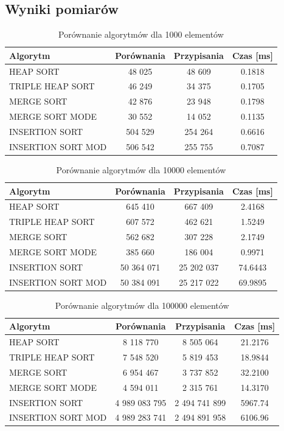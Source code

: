 \documentclass[12pt,a4paper]{article}
\begin{document}
\subsection{Wyniki pomiarów}

\begin{table}[H]
\centering
\caption{Porównanie algorytmów dla 1000 elementów}
\begin{tabular}{|l|c|c|c|}
\hline
Algorytm & Porównania & Przypisania & Czas [ms] \\
\hline
HEAP SORT & 48 025 & 48 609 & 0.1818 \\
TRIPLE HEAP SORT & 46 249 & 34 375 & 0.1705 \\
MERGE SORT & 42 876 & 23 948 & 0.1798 \\
MERGE SORT MODE & 30 552 & 14 052 & 0.1135 \\
INSERTION SORT & 504 529 & 254 264 & 0.6616 \\
INSERTION SORT MOD & 506 542 & 255 755 & 0.7087 \\
\hline
\end{tabular}
\end{table}

\begin{table}[H]
\centering
\caption{Porównanie algorytmów dla 10000 elementów}
\begin{tabular}{|l|c|c|c|}
\hline
Algorytm & Porównania & Przypisania & Czas [ms] \\
\hline
HEAP SORT & 645 410 & 667 409 & 2.4168 \\
TRIPLE HEAP SORT & 607 572 & 462 621 & 1.5249 \\
MERGE SORT & 562 682 & 307 228 & 2.1749 \\
MERGE SORT MODE & 385 660 & 186 004 & 0.9971 \\
INSERTION SORT & 50 364 071 & 25 202 037 & 74.6443 \\
INSERTION SORT MOD & 50 384 091 & 25 217 022 & 69.9895 \\
\hline
\end{tabular}
\end{table}

\begin{table}[H]
\centering
\caption{Porównanie algorytmów dla 100000 elementów}
\begin{tabular}{|l|c|c|c|}
\hline
Algorytm & Porównania & Przypisania & Czas [ms] \\
\hline
HEAP SORT & 8 118 770 & 8 505 064 & 21.2176 \\
TRIPLE HEAP SORT & 7 548 520 & 5 819 453 & 18.9844 \\
MERGE SORT & 6 954 467 & 3 737 852 & 32.2100 \\
MERGE SORT MODE & 4 594 011 & 2 315 761 & 14.3170 \\
INSERTION SORT & 4 989 083 795 & 2 494 741 899 & 5967.74 \\
INSERTION SORT MOD & 4 989 283 741 & 2 494 891 958 & 6106.96 \\
\hline
\end{tabular}
\end{table}
\end{document}
